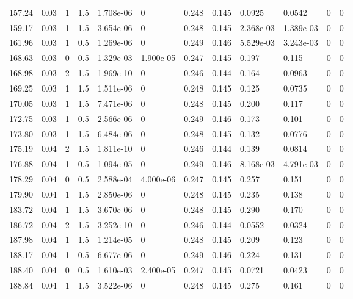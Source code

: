 \documentclass[preview]{standalone}
\begin{document}
{{{\begin{tabular}{L{1.2cm}C{1.2cm} C{0.3cm}C{0.5cm} C{1.4cm}C{1.4cm} C{1.4cm}C{1.4cm} C{1.6cm}C{1.6cm} C{1.6cm}C{1.6cm}}
  157.24  &  0.03  & 1     & 1.5 &  1.708e-06  & 0  &  0.248&   0.145& 0.0925 & 0.0542   &  0 & 0  \\ 
  159.17  &  0.03  & 1     & 1.5 &  3.654e-06  & 0  &  0.248&   0.145& 2.368e-03 & 1.389e-03   &  0 & 0  \\ 
  161.96  &  0.03  & 1     & 0.5 &  1.269e-06  & 0  &  0.249&   0.146& 5.529e-03 & 3.243e-03   &  0 & 0  \\ 
  168.63  &  0.03  & 0     & 0.5 &  1.329e-03  & 1.900e-05  &  0.247&   0.145& 0.197 & 0.115   &  0 & 0  \\ 
  168.98  &  0.03  & 2     & 1.5 &  1.969e-10  & 0  &  0.246&   0.144& 0.164 & 0.0963   &  0 & 0  \\ 
  169.25  &  0.03  & 1     & 1.5 &  1.511e-06  & 0  &  0.248&   0.145& 0.125 & 0.0735   &  0 & 0  \\ 
  170.05  &  0.03  & 1     & 1.5 &  7.471e-06  & 0  &  0.248&   0.145& 0.200 & 0.117   &  0 & 0  \\ 
  172.75  &  0.03  & 1     & 0.5 &  2.566e-06  & 0  &  0.249&   0.146& 0.173 & 0.101   &  0 & 0  \\ 
  173.80  &  0.03  & 1     & 1.5 &  6.484e-06  & 0  &  0.248&   0.145& 0.132 & 0.0776   &  0 & 0  \\ 
  175.19  &  0.04  & 2     & 1.5 &  1.811e-10  & 0  &  0.246&   0.144& 0.139 & 0.0814   &  0 & 0  \\ 
  176.88  &  0.04  & 1     & 0.5 &  1.094e-05  & 0  &  0.249&   0.146& 8.168e-03 & 4.791e-03   &  0 & 0  \\ 
  178.29  &  0.04  & 0     & 0.5 &  2.588e-04  & 4.000e-06  &  0.247&   0.145& 0.257 & 0.151   &  0 & 0  \\ 
  179.90  &  0.04  & 1     & 1.5 &  2.850e-06  & 0  &  0.248&   0.145& 0.235 & 0.138   &  0 & 0  \\ 
  183.72  &  0.04  & 1     & 1.5 &  3.670e-06  & 0  &  0.248&   0.145& 0.290 & 0.170   &  0 & 0  \\ 
  186.72  &  0.04  & 2     & 1.5 &  3.252e-10  & 0  &  0.246&   0.144& 0.0552 & 0.0324   &  0 & 0  \\ 
  187.98  &  0.04  & 1     & 1.5 &  1.214e-05  & 0  &  0.248&   0.145& 0.209 & 0.123   &  0 & 0  \\ 
  188.17  &  0.04  & 1     & 0.5 &  6.677e-06  & 0  &  0.249&   0.146& 0.224 & 0.131   &  0 & 0  \\ 
  188.40  &  0.04  & 0     & 0.5 &  1.610e-03  & 2.400e-05  &  0.247&   0.145& 0.0721 & 0.0423   &  0 & 0  \\ 
  188.84  &  0.04  & 1     & 1.5 &  3.522e-06  & 0  &  0.248&   0.145& 0.275 & 0.161   &  0 & 0  \\ 

\end{tabular}}}}
\end{document}
